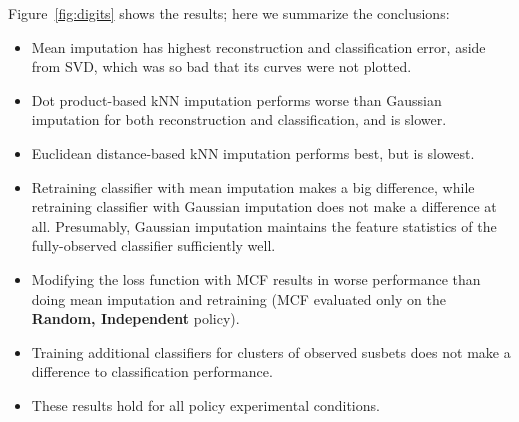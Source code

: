 Figure~\ref{fig:digits} shows the results; here we summarize the conclusions:
\begin{itemize}
\item Mean imputation has highest reconstruction and classification error, aside from SVD, which was so bad that its curves were not plotted.
\item Dot product-based kNN imputation performs worse than Gaussian imputation for both reconstruction and classification, and is slower.
\item Euclidean distance-based kNN imputation performs best, but is slowest.
\item Retraining classifier with mean imputation makes a big difference, while retraining classifier with Gaussian imputation does not make a difference at all.
Presumably, Gaussian imputation maintains the feature statistics of the fully-observed classifier sufficiently well.
\item Modifying the loss function with MCF results in worse performance than doing mean imputation and retraining (MCF evaluated only on the \textbf{Random, Independent} policy).
\item Training additional classifiers for clusters of observed susbets does not make a difference to classification performance.
\item These results hold for all policy experimental conditions.
\end{itemize}

